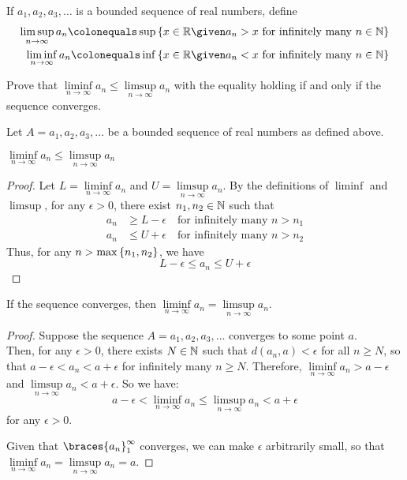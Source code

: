 \begin{problem}
  If $a_1, a_2, a_3, \ldots$ is a bounded sequence of real numbers, define
  \begin{align*}
    \limsup\limits_{n \to \infty}{a_n}
    \colonequals
    \sup \set{x \in \R \given a_n > x \text{ for infinitely many } n \in \N}
    \\
    \liminf\limits_{n \to \infty}{a_n}
    \colonequals
    \inf \set{x \in \R \given a_n < x \text{ for infinitely many } n \in \N}
  \end{align*}

  Prove that $\liminf\limits_{n \to \infty}{a_n} \leq \limsup\limits_{n \to \infty}{a_n}$
  with the equality holding if and only if the sequence converges.
\end{problem}

\begin{answer}
  Let $A = a_1, a_2, a_3, \ldots$ be a bounded sequence of real numbers as defined above.

  \begin{claim}
    $\liminf\limits_{n \to \infty}{a_n} \leq \limsup\limits_{n \to \infty}{a_n}$
    \begin{proof}
      Let $L = \liminf\limits_{n \to \infty}{a_n}$ and $U = \limsup\limits_{n \to \infty}{a_n}$.
      By the definitions of $\liminf$ and $\limsup$, for any $\epsilon > 0$, there exist
      $n_1, n_2 \in \mathbb{N}$ such that
      \begin{align*}
        a_n &\ge L - \epsilon \quad \text{for infinitely many } n > n_1 \\
        a_n &\le U + \epsilon \quad \text{for infinitely many } n > n_2
      \end{align*}
      Thus, for any $n > \max\left\{n_1, n_2\right\}$, we have
      \[ L - \epsilon \le a_n \le U + \epsilon \]
    \end{proof}
  \end{claim}

  \newpage
  \begin{claim}
    If the sequence converges, then $\liminf\limits_{n \to \infty}{a_n} = \limsup\limits_{n \to \infty}{a_n}$.

    \begin{proof}
      Suppose the sequence $A = a_1, a_2, a_3, \ldots$ converges to some point $a$. \\
      Then, for any $\epsilon > 0$, there exists $N \in \mathbb{N}$ such that
      $d(a_n, a) < \epsilon$ for all $n \geq N$,
      so that $a - \epsilon < a_n < a + \epsilon$ for infinitely many $n \geq N$.
      Therefore, $\liminf\limits_{n \to \infty}{a_n} > a - \epsilon$ and
      $\limsup\limits_{n \to \infty}{a_n} < a + \epsilon$.
      So we have:
      \[ a - \epsilon < \liminf\limits_{n \to \infty}{a_n} \leq \limsup\limits_{n \to \infty}{a_n} < a + \epsilon \]
      for any $\epsilon > 0$.

      \step
      Given that $\braces{a_n}_1^\infty$ converges, we can make $\epsilon$ arbitrarily
      small, so that $\liminf\limits_{n \to \infty}{a_n} = \limsup\limits_{n \to \infty}{a_n} = a$.
    \end{proof}
  \end{claim}
  
\end{answer}
